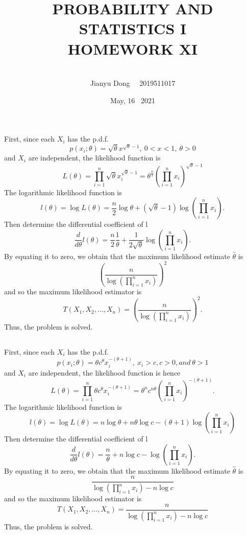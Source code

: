 \documentclass[10.5pt]{article}
\title{PROBABILITY AND STATISTICS I
\\HOMEWORK XI}
\author{\\Jianyu Dong   ~~2019511017}
\date{May, 16~ 2021}
\begin{document}
    
\maketitle
\newpage

\section{}
\subsection{}
First, since each $X_i$ has the p.d.f. $$p(x_i;\theta)=\sqrt{\theta}x^{\sqrt{\theta}-1},~0<x<1,~\theta>0$$\indent
and $X_i$ are independent, the likelihood function is $$L(\theta)=\prod_{i=1}^n\sqrt{\theta}x_i^{\sqrt{\theta}-1}=\theta^{\frac{n}{2}}\left(\prod_{i=1}^nx_i\right)^{\sqrt{\theta}-1}$$\indent
The logarithmic likelihood function is $$l(\theta)=\log L(\theta)=\frac{n}{2}\log\theta+(\sqrt{\theta}-1)\log(\prod_{i=1}^nx_i).$$\indent
Then determine the differential coefficient of l $$\frac{d}{d\theta}l(\theta)=\frac{n}{2}\frac{1}{\theta}+\frac{1}{2\sqrt{\theta}}\log(\prod_{i=1}^nx_i).$$\indent
By equating it to zero, we obtain that the maximum likelihood estimate $\hat{\theta}$ is $$\left(\frac{n}{\log(\prod_{i=1}^nx_i)}\right)^2$$\indent
and so the maximum likelihood estimator is $$T(X_1,X_2,\dots,X_n)=\left(\frac{n}{\log(\prod_{i=1}^nx_i)}\right)^2.$$\indent
Thus, the problem is solved.

\subsection{}
First, since each $X_i$ has the p.d.f. $$p(x_i;\theta)=\theta c^{\theta}x_i^{-(\theta+1)},~x_i>c,c>0,and~\theta>1$$\indent
and $X_i$ are independent, the likelihood function is hence $$L(\theta)=\prod_{i=1}^n\theta c^{\theta}x_i^{-(\theta+1)}=\theta^nc^{n\theta}\left(\prod_{i=1}^nx_i\right)^{-(\theta+1)}.$$\indent
The logarithmic likelihood function is $$l(\theta)=\log L(\theta)=n\log\theta+n\theta\log c-(\theta+1)\log(\prod_{i=1}^nx_i)$$\indent
Then determine the differential coefficient of l $$\frac{d}{d\theta}l(\theta)=\frac{n}{\theta}+n\log c-\log(\prod_{i=1}^nx_i).$$\indent
By equating it to zero, we obtain that the maximum likelihood estimate $\hat{\theta}$ is $$\frac{n}{\log(\prod_{i=1}^nx_i)-n\log c}$$\indent
and so the maximum likelihood estimator is $$T(X_1,X_2,\dots,X_n)=\frac{n}{\log(\prod_{i=1}^nx_i)-n\log c}$$\indent
Thus, the problem is solved.
\end{document}
